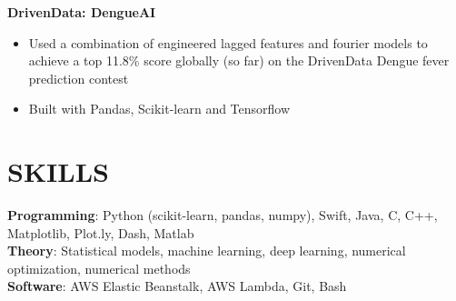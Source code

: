 \documentclass[margin]{res}
\begin{document}
\begin{resume}
    \textbf{DrivenData: DengueAI}
    \begin{itemize}
        \item Used a combination of engineered lagged features and fourier models to achieve a top 11.8\% score globally (so far) on the DrivenData Dengue fever prediction contest
        \item Built with Pandas, Scikit-learn and Tensorflow
    \end{itemize}\vspace*{-8pt}



\section{SKILLS} 
    \textbf{Programming}: Python (scikit-learn, pandas, numpy), Swift, Java, C, C++,\\Matplotlib, Plot.ly, Dash, Matlab\\
    \textbf{Theory}: Statistical models, machine learning, deep learning, numerical optimization, numerical methods \\
    \textbf{Software}: AWS Elastic Beanstalk, AWS Lambda, Git, Bash

\end{resume}
\end{document}
